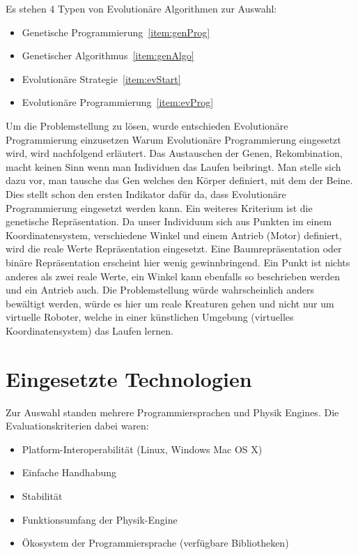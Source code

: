     Es stehen 4 Typen von Evolutionäre Algorithmen zur Auswahl:
    \begin{itemize}
      \item Genetische Programmierung~\ref{item:genProg}
      \item Genetischer Algorithmus~\ref{item:genAlgo}
      \item Evolutionäre Strategie~\ref{item:evStart}
      \item Evolutionäre Programmierung~\ref{item:evProg}
    \end{itemize}
    Um die Problemstellung zu lösen, wurde entschieden Evolutionäre Programmierung einzusetzen
    Warum Evolutionäre Programmierung eingesetzt wird, wird nachfolgend erläutert.
    Das Austauschen der Genen, Rekombination, macht keinen Sinn wenn man Individuen das Laufen beibringt.
    Man stelle sich dazu vor, man tausche das Gen welches den Körper definiert, mit dem der Beine.
    Dies stellt schon den ersten Indikator dafür da,
    dass Evolutionäre Programmierung eingesetzt werden kann. Ein weiteres Kriterium ist die genetische Repräsentation.
    Da unser Individuum sich aus Punkten im einem Koordinatensystem,
    verschiedene Winkel und einem Antrieb (Motor) definiert, wird die reale Werte Repräsentation eingesetzt.
    Eine Baumrepräsentation oder binäre Repräsentation erscheint hier wenig gewinnbringend.
    Ein Punkt ist nichts anderes als zwei reale Werte,
    ein Winkel kann ebenfalls so beschrieben werden und ein Antrieb auch.
    Die Problemstellung würde wahrscheinlich anders bewältigt werden,
    würde es hier um reale Kreaturen gehen und nicht nur um virtuelle Roboter,
    welche in einer künstlichen Umgebung (virtuelles Koordinatensystem) das Laufen lernen.

  \section{Eingesetzte Technologien\label{sec:Technology}}

    Zur Auswahl standen mehrere Programmiersprachen und Physik Engines.
    Die Evaluationskriterien dabei waren:
    \begin{itemize}
      \item Platform-Interoperabilität (Linux, Windows Mac OS X)
      \item Einfache Handhabung
      \item Stabilität
      \item Funktionsumfang der Physik-Engine
      \item Ökosystem der Programmiersprache (verfügbare Bibliotheken)
    \end{itemize}

